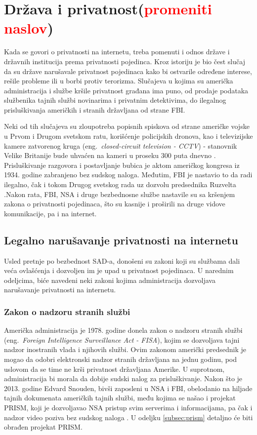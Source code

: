 \documentclass[a4paper]{article}
\newcommand\todos[1]{\textcolor{red}{#1}}
\begin{document}
\section{Država i privatnost(\todos{promeniti naslov})}	
\label{sec:drugoPoglavlje}
\par Kada se govori o privatnosti na internetu, treba pomenuti i odnos države i državnih institucija prema privatnosti pojedinca. Kroz istoriju je bio čest slučaj da su države narušavale privatnost pojedinaca kako bi ostvarile određene interese, rešile probleme ili u borbi protiv terorizma. Slučajeva u kojima su američka administracija i službe kršile privatnost građana ima puno, od prodaje podataka službenika tajnih službi novinarima i privatnim detektivima, do ilegalnog prisluškivanja američkih i stranih državljana od strane FBI. \par Neki od tih slučajeva su zloupotreba popisnih spiskova od strane američke vojske u Prvom i Drugom svetskom ratu, korišćenje policijskih dronova, kao i televizijske kamere zatvorenog kruga (eng.~{\em closed-circuit television - CCTV}) - stanovnik Velike Britanije bude uhvaćen na kameri u proseku 300 puta dnevno \cite{ethics, london}. Prisluškivanje razgovora i postavljanje bubica je aktom američkog kongresa iz 1934. godine zabranjeno bez sudskog naloga. Međutim, FBI je nastavio to da radi ilegalno, čak i tokom Drugog svetskog rada uz dozvolu predsednika Ruzvelta \cite{ruzvelt}.Nakon rata, FBI, NSA i druge bezbednosne službe nastavile su sa kršenjem zakona o privatnosti pojedinaca, što su kasnije i proširili na druge vidove komunikacije, pa i na internet.

\subsection{Legalno narušavanje privatnosti na internetu}
\label{subsec:zakoni}
\par Usled pretnje po bezbednost SAD-a, donošeni su zakoni koji su službama dali veća ovlašćenja i dozvoljen im je upad u privatnost pojedinaca. U narednim odeljcima, biće navedeni neki zakoni kojima administracija dozvoljava narušavanje privatnosti na internetu.

\subsubsection{Zakon o nadzoru stranih službi}
Američka administracija je 1978. godine donela zakon o nadzoru stranih službi (eng.~{\em Foreign Intelligence Surveillance Act - FISA}),  kojim se dozvoljava tajni nadzor inostranih vlada i njihovih službi. Ovim zakonom američki predsednik je mogao da odobri elektronski nadzor stranih državljana na jednu godinu, pod uslovom da se time ne krši privatnost državljana Amerike. U suprotnom, administracija bi morala da dobije sudski nalog za prisluškivanje. Nakon što je 2013. godine Edvard Snouden, bivši zaposleni u NSA i FBI, obelodanio na hiljade tajnih dokumenata američkih tajnih službi, među kojima se našao i projekat PRISM, koji je dozvoljavao NSA pristup svim serverima i informacijama, pa čak i nadzor video poziva bez sudskog naloga \cite{prism}. U odeljku \ref{subsec:prism} detaljno će biti obrađen projekat PRISM.
\end{document}
